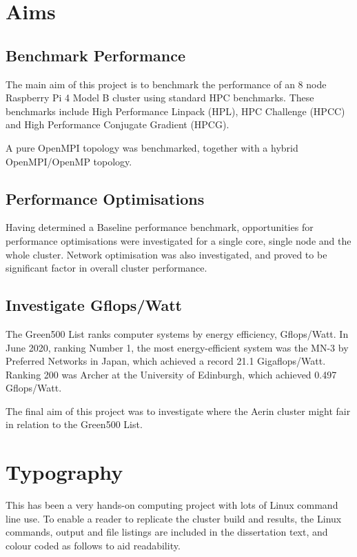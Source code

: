 \documentclass{report}
\begin{document}
%
%
\section{Aims}


%
%
\subsection{Benchmark Performance}

The main aim of this project is to benchmark the performance of an 8 node Raspberry Pi 4 Model B cluster using standard HPC benchmarks. These benchmarks include High Performance Linpack (HPL), HPC Challenge (HPCC) and High Performance Conjugate Gradient (HPCG).

A pure OpenMPI topology was benchmarked, together with a hybrid OpenMPI/OpenMP topology.


%
%
\subsection{Performance Optimisations}

Having determined a Baseline performance benchmark, opportunities for performance optimisations were investigated for a single core, single node and the whole cluster. Network optimisation was also investigated, and proved to be significant factor in overall cluster performance. 


%
%
\subsection{Investigate Gflops/Watt}

The Green500 List ranks computer systems by energy efficiency, Gflops/Watt. In June 2020, ranking Number 1, the most energy-efficient system was the MN-3 by Preferred Networks in Japan, which achieved a record 21.1 Gigaflops/Watt. Ranking 200 was Archer at the University of Edinburgh, which achieved 0.497 Gflops/Watt.

The final aim of this project was to investigate where the Aerin cluster might fair in relation to the Green500 List. 


%
%
\section{Typography}

This has been a very hands-on computing project with lots of Linux command line use. To enable a reader to replicate the cluster build and results, the Linux commands, output and file listings are included in the dissertation text, and colour coded as follows to aid readability.
\end{document}
